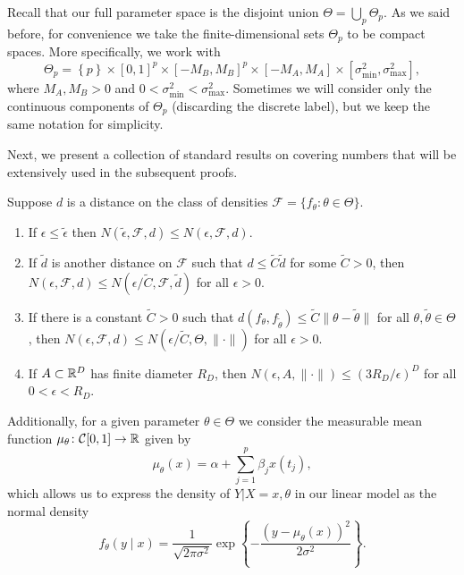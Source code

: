 Recall that our full parameter space is the disjoint union \(\Theta=\bigcup_p\Theta_p\). As we said before, for convenience we take the finite-dimensional sets \(\Theta_p\) to be compact spaces. More specifically, we work with
\[
  \Theta_p = \left\{p\right\} \times [0,1]^p \times [-M_B, M_B]^p \times [-M_A, M_A] \times [\sigma^2_{\text{min}}, \sigma^2_{\text{max}}],
\]
where \(M_A,M_B>0\) and \(0<\sigma^2_{\text{min}}<\sigma^2_{\text{max}}\). Sometimes we will consider only the continuous components of \(\Theta_p\) (discarding the discrete label), but we keep the same notation for simplicity.

Next, we present a collection of standard results on covering numbers that will be extensively used in the subsequent proofs.

\begin{lemma}\label{lemma:covering-number}
  Suppose \(d\) is a distance on the class of densities \(\mathcal F=\{f_\theta: \theta\in\Theta\}\).
  \begin{enumerate}[label=(\roman*)]
    \item If \(\epsilon\leq \tilde\epsilon\) then \(N(\tilde\epsilon, \mathcal F, d) \leq N(\epsilon, \mathcal F, d)\).
    \item If \(\tilde d\) is another distance on \(\mathcal F\) such that \(d\leq \tilde C \tilde d\) for some \(\tilde C > 0\), then \(N(\epsilon, \mathcal F, d) \leq N(\epsilon/\tilde C, \mathcal F, \tilde d)\) for all \(\epsilon > 0\).
    \item If there is a constant \(\tilde C>0\) such that \(d(f_{\theta}, f_{\tilde\theta})\leq \tilde C \|\theta - \tilde\theta\|\) for all \(\theta, \tilde\theta \in  \Theta\), then \(N(\epsilon, \mathcal F, d)\leq N(\epsilon/\tilde C, \Theta, \|\cdot\|)\) for all \(\epsilon > 0\). %
    \item If \(A\subset \mathbb{R}^D\) has finite diameter \(R_D\), then \(N(\epsilon, A, \|\cdot\|) \leq (3R_D/\epsilon)^D\) for all \(0<\epsilon<R_D\). %
  \end{enumerate}
\end{lemma}

Additionally, for a given parameter \(\theta\in\Theta\) we consider the measurable mean function \(\mu_\theta\colon\mathcal C[0,1]\to \mathbb{R}\) given by 
\[
  \mu_\theta(x)=\alpha + \sum_{j=1}^p \beta_j x(t_j),
\] 
which allows us to express the density of \(Y|X=x, \theta\) in our linear model as the normal density
\[
  f_\theta(y\mid x) = \frac{1}{\sqrt{2\pi\sigma^2}}\exp\left\{-\frac{(y-\mu_\theta(x))^2}{2\sigma^2}\right\}.
\]

